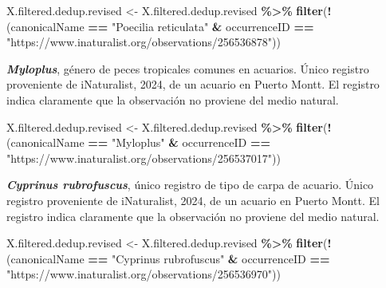 \documentclass[sn-apa,pdflatex]{sn-jnl}
\newenvironment{Shaded}{\begin{snugshade}}{\end{snugshade}}
\newcommand{\FunctionTok}[1]{\textcolor[rgb]{0.13,0.29,0.53}{\textbf{#1}}}
\newcommand{\NormalTok}[1]{#1}
\newcommand{\OtherTok}[1]{\textcolor[rgb]{0.56,0.35,0.01}{#1}}
\newcommand{\SpecialCharTok}[1]{\textcolor[rgb]{0.81,0.36,0.00}{\textbf{#1}}}
\newcommand{\StringTok}[1]{\textcolor[rgb]{0.31,0.60,0.02}{#1}}
\begin{document}
\begin{Shaded}
\begin{Highlighting}[]
\NormalTok{X.filtered.dedup.revised }\OtherTok{\textless{}{-}}\NormalTok{ X.filtered.dedup.revised }\SpecialCharTok{\%\textgreater{}\%}
    \FunctionTok{filter}\NormalTok{(}\SpecialCharTok{!}\NormalTok{(canonicalName }\SpecialCharTok{==} \StringTok{"Poecilia reticulata"} \SpecialCharTok{\&}\NormalTok{ occurrenceID }\SpecialCharTok{==}
        \StringTok{"https://www.inaturalist.org/observations/256536878"}\NormalTok{))}
\end{Highlighting}
\end{Shaded}

\textbf{\emph{Myloplus}}, género de peces tropicales comunes en
acuarios. Único registro proveniente de iNaturalist, 2024, de un acuario
en Puerto Montt. El registro indica claramente que la observación no
proviene del medio natural.

\begin{Shaded}
\begin{Highlighting}[]
\NormalTok{X.filtered.dedup.revised }\OtherTok{\textless{}{-}}\NormalTok{ X.filtered.dedup.revised }\SpecialCharTok{\%\textgreater{}\%}
    \FunctionTok{filter}\NormalTok{(}\SpecialCharTok{!}\NormalTok{(canonicalName }\SpecialCharTok{==} \StringTok{"Myloplus"} \SpecialCharTok{\&}\NormalTok{ occurrenceID }\SpecialCharTok{==} \StringTok{"https://www.inaturalist.org/observations/256537017"}\NormalTok{))}
\end{Highlighting}
\end{Shaded}

\textbf{\emph{Cyprinus rubrofuscus}}, único registro de tipo de carpa de
acuario. Único registro proveniente de iNaturalist, 2024, de un acuario
en Puerto Montt. El registro indica claramente que la observación no
proviene del medio natural.

\begin{Shaded}
\begin{Highlighting}[]
\NormalTok{X.filtered.dedup.revised }\OtherTok{\textless{}{-}}\NormalTok{ X.filtered.dedup.revised }\SpecialCharTok{\%\textgreater{}\%}
    \FunctionTok{filter}\NormalTok{(}\SpecialCharTok{!}\NormalTok{(canonicalName }\SpecialCharTok{==} \StringTok{"Cyprinus rubrofuscus"} \SpecialCharTok{\&}\NormalTok{ occurrenceID }\SpecialCharTok{==}
        \StringTok{"https://www.inaturalist.org/observations/256536970"}\NormalTok{))}
\end{Highlighting}
\end{Shaded}
\end{document}
